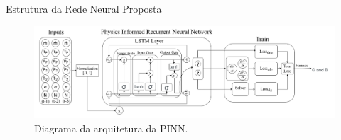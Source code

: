 \begin{frame}{Estrutura da Rede Neural Proposta}
    \vspace{-0.3cm}
    \begin{figure}
        \centering
        \includegraphics[width=1.0\textwidth]{figures/PIRNN.png} %
        \caption{\small Diagrama da arquitetura da PINN.}
    \end{figure}
\end{frame}
